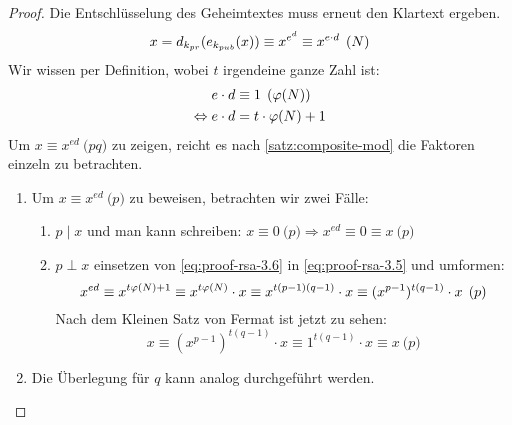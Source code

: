 \begin{proof}
  Die Entschlüsselung des Geheimtextes muss erneut den Klartext ergeben.
  \begin{equation}
    \label{eq:proof-rsa-3.5}
    x = d_{k_{pr}}(e_{k_{pub}}(x)) \equiv x^{e^d} \equiv x^{e \cdot d} \pod{N}
  \end{equation}
  Wir wissen per Definition, wobei $t$ irgendeine ganze Zahl ist:
  \begin{align}
    e \cdot d                 & \equiv 1 \pod{\varphi(N)} \notag \\
    \label{eq:proof-rsa-3.6}
    \Leftrightarrow e \cdot d & = t \cdot \varphi(N) + 1
  \end{align}
  Um $x \equiv x^{ed} \pod{pq}$ zu zeigen, reicht es nach \autoref{satz:composite-mod}
  die Faktoren einzeln zu betrachten.
  \begin{enumerate}
    \item Um $x \equiv x^{ed} \pod{p}$ zu beweisen, betrachten wir zwei Fälle:
          \begin{enumerate}[topsep=0pt]
            \item $p \mid x$ und man kann schreiben:
                  $x \equiv 0 \pod{p} \Rightarrow x^{ed} \equiv 0 \equiv x \pod{p}$
            \item $p \perp x$ einsetzen von \eqref{eq:proof-rsa-3.6} in \eqref{eq:proof-rsa-3.5}
                  und umformen:
                  \begin{equation*}
                    x^{ed} \equiv x^{t\varphi(N) + 1} \equiv
                    x^{t\varphi(N)} \cdot x \equiv
                    x^{t(p - 1)(q - 1)} \cdot x \equiv
                    (x^{p - 1})^{t(q - 1)} \cdot x \pod{p}
                  \end{equation*}
                  Nach dem Kleinen Satz von Fermat ist jetzt zu sehen:
                  \begin{equation*}
                    x \equiv (x^{p - 1})^{t(q - 1)} \cdot x \equiv
                    1^{t(q - 1)} \cdot x \equiv x \pod{p}
                  \end{equation*}
          \end{enumerate}
    \item Die Überlegung für $q$ kann analog durchgeführt werden.
  \end{enumerate}
\end{proof}


